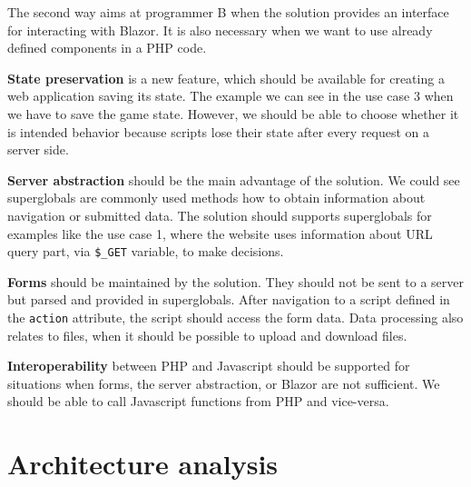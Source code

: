 The second way aims at programmer B when the solution provides an interface for interacting with Blazor.
It is also necessary when we want to use already defined components in a PHP code.
\par
\textbf{State preservation} is a new feature, which should be available for creating a web application saving its state.
The example we can see in the use case 3 when we have to save the game state.
However, we should be able to choose whether it is intended behavior because scripts lose their state after every request on a server side.
\par
\textbf{Server abstraction} should be the main advantage of the solution.
We could see superglobals are commonly used methods how to obtain information about navigation or submitted data.
The solution should supports superglobals for examples like the use case 1, where the website uses information about URL query part, via \texttt{\$\_GET} variable, to make decisions.
\par
\textbf{Forms} should be maintained by the solution. 
They should not be sent to a server but parsed and provided in superglobals. 
After navigation to a script defined in the \texttt{action} attribute, the script should access the form data.
Data processing also relates to files, when it should be possible to upload and download files.
\par
\textbf{Interoperability} between PHP and Javascript should be supported for situations when forms, the server abstraction, or Blazor are not sufficient.
We should be able to call Javascript functions from PHP and vice-versa.

\section{Architecture analysis}

